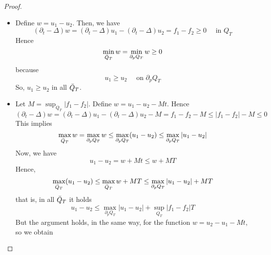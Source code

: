 \begin{ProofBox}
    \begin{proof}
        \begin{itemize}
            \item Define $w=u_1-u_2$. Then, we have
            \begin{equation*}
                (\partial_t - \Delta)w = (\partial_t - \Delta) u_1-(\partial_t -\Delta)u_2 = f_1 - f_2 \geq 0 \quad \text{ in }Q_T
            \end{equation*}
            Hence
            \begin{equation*}
                \min_{\Bar{Q}_T} w = \min_{ \partial_p Q_T} w \geq 0
            \end{equation*}
            because 
            \begin{equation*}
                u_1 \geq u_2 \quad \text{ on } \partial_p Q_T
            \end{equation*}
            So, $u_1 \geq u_2 $ in all $\Bar{Q}_T$.
            \item Let $M=\sup_{Q_T} |f_1 - f_2|$. Define $w=u_1-u_2 - Mt$. Hence
            \begin{equation*}
                (\partial_t - \Delta) w = (\partial_t - \Delta)u_1- (\partial_t - \Delta) u_2 - M = f_1 - f_2 - M \leq |f_1 - f_2| - M \leq 0
            \end{equation*}
            This implies 
            \begin{equation*}
                \max_{\Bar{Q}_T} w = \max_{ \partial_p Q_T} w \leq \max_{ \partial_p Q_T} (u_1 - u_2) \leq \max_{ \partial_p Q_T} |u_1-u_2|
            \end{equation*}
            Now, we have
            \begin{equation*}
                u_1 - u_2 = w + Mt \leq w + MT
            \end{equation*}
            Hence, 
            \begin{equation*}
                \max_{\Bar{Q}_T}(u_1- u_2) \leq \max_{\Bar{Q}_T} w + MT \leq \max_{ \partial_p Q_T} |u_1 - u_2| + MT
            \end{equation*}
            that is, in all $\Bar{Q}_T$ it holds
            \begin{equation*}
                u_1-u_2 \leq \max_{ \partial_p Q_T} |u_1-u_2| + \sup_{Q_T} |f_1-f_2| T
            \end{equation*}
            But the argument holds, in the same way, for the function $w = u_2 - u_1 - Mt$, so we obtain

\end{itemize}
\end{proof}
\end{ProofBox}
